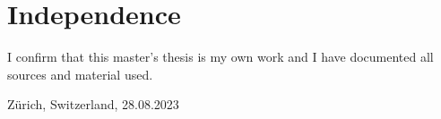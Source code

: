 \chapter*{Independence}

\vspace{2cm} 

I confirm that this master's thesis is my own work and I have documented all sources and material used.\\ \vspace{5em}

\begin{flushright}
	Z{\"u}rich, Switzerland, 28.08.2023
\end{flushright}